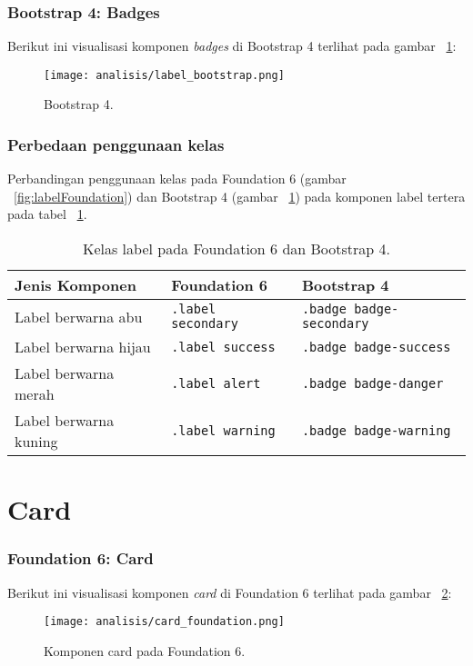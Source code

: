 \subsubsection{Bootstrap 4: Badges}
Berikut ini visualisasi komponen \textit{badges} di Bootstrap 4 terlihat pada gambar ~\ref{fig:labelBootstrap}:
	\begin{figure}[H] 
		\centering
		\texttt{[image: analisis/label\_bootstrap.png]}
		\caption{Bootstrap 4.} 
		\label{fig:labelBootstrap}
	\end{figure}
	

\subsubsection{Perbedaan penggunaan kelas}
\noindent Perbandingan penggunaan kelas pada Foundation 6 (gambar ~\ref{fig:labelFoundation}) dan Bootstrap 4 (gambar ~\ref{fig:labelBootstrap}) pada komponen label tertera pada tabel ~\ref{table:label}.\\

\begin{table}[H] 
	\caption{Kelas label pada Foundation 6 dan Bootstrap 4.}
	\begin{tabular}{| p{} | p{} | p{} |} 
		\hline
		\textbf{Jenis Komponen} & \textbf{Foundation 6} & \textbf{Bootstrap 4}  \\ [0.5ex] 
		\hline	
		Label berwarna abu & \texttt{.label secondary} & \texttt{.badge badge-secondary}\\ 
		\hline
		Label berwarna hijau & \texttt{.label success} & \texttt{.badge badge-success}\\ 
		\hline
		Label berwarna merah & \texttt{.label alert} & \texttt{.badge badge-danger}\\ 
		\hline
		Label berwarna kuning & \texttt{.label warning} & \texttt{.badge badge-warning}\\ [1ex]
		\hline
	\end{tabular}
	\label{table:label}
\end{table}

\section{Card}

\subsubsection{Foundation 6: Card}
Berikut ini visualisasi komponen \textit{card} di Foundation 6 terlihat pada gambar ~\ref{fig:cardFoundation}:
\begin{figure} [H]	
	\centering
	\texttt{[image: analisis/card\_foundation.png]}
	\caption{Komponen card pada Foundation 6.}
	\label{fig:cardFoundation}	
\end{figure}


